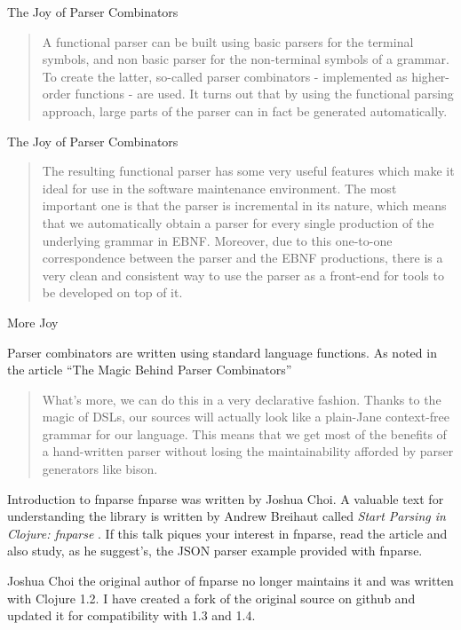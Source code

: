 \documentclass[presentation]{beamer}
\begin{document}
\begin{frame}{The Joy of Parser Combinators}
\begin{quotation}
A functional parser can be built using basic parsers for the terminal
symbols, and non basic parser for the non-terminal symbols of a
grammar. To create the latter, so-called parser combinators -
implemented as higher-order functions - are used. It turns out that by
using the functional parsing approach, large parts of the parser can
in fact be generated automatically.
\end{quotation}
\end{frame}

\begin{frame}{The Joy of Parser Combinators}
\begin{quotation}
 The resulting functional parser has some very useful features which
make it ideal for use in the software maintenance environment. The
most important one is that the parser is incremental in its nature,
which means that we automatically obtain a parser for every single
production of the underlying grammar in EBNF. Moreover, due to this
one-to-one correspondence between the parser and the EBNF productions,
there is a very clean and consistent way to use the parser as a
front-end for tools to be developed on top of it.\cite{Baumann}
\end{quotation}
\end{frame}

\begin{frame}{More Joy}

  Parser combinators are written using standard language functions. As
  noted in the article ``The Magic Behind Parser Combinators''\cite{Spiewak}

\begin{quotation}
  What's more, we can do this in a very declarative fashion.  Thanks
  to the magic of DSLs, our sources will actually look like a
  plain-Jane context-free grammar for our language.  This means that
  we get most of the benefits of a hand-written parser without losing
  the maintainability afforded by parser generators like bison.
\end{quotation}
\end{frame}

\begin{frame}{Introduction to fnparse}
  fnparse was written by Joshua Choi. A valuable text for
  understanding the library is written by Andrew Breihaut called
  \emph{Start Parsing in Clojure: fnparse} \cite{Breihaut}.  If this
  talk piques your interest in fnparse, read the article and also
  study, as he suggest's, the JSON parser example provided with
  fnparse.

  Joshua Choi the original author of fnparse no longer maintains it
  and was written with Clojure 1.2. I have created a fork of the
  original source on github and updated it for compatibility with 1.3
  and 1.4.
\end{frame}
\end{document}
